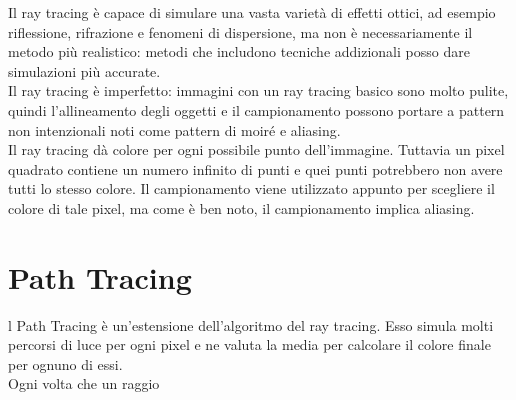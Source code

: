 \documentclass[9pt,a4paper,twoside]{tau}
\begin{document}
Il ray tracing è capace di simulare una vasta varietà di effetti ottici, ad esempio riflessione, rifrazione e fenomeni di dispersione, ma non è necessariamente il metodo più realistico: metodi che includono tecniche addizionali posso dare simulazioni più accurate. \\
Il ray tracing è imperfetto: immagini con un ray tracing basico sono molto pulite, quindi l'allineamento degli oggetti e il campionamento possono portare a pattern non intenzionali noti come pattern di moiré e aliasing. \\
Il ray tracing dà colore per ogni possibile punto dell'immagine. Tuttavia un pixel quadrato contiene un numero infinito di punti e quei punti potrebbero non avere tutti lo stesso colore. Il campionamento viene utilizzato appunto per scegliere il colore di tale pixel, ma come è ben noto, il campionamento implica aliasing.

\section{Path Tracing}
l Path Tracing è un'estensione dell'algoritmo del ray tracing. Esso simula molti percorsi di luce per ogni pixel e ne valuta la media per calcolare il colore finale per ognuno di essi.\\
Ogni volta che un raggio

\end{document}
